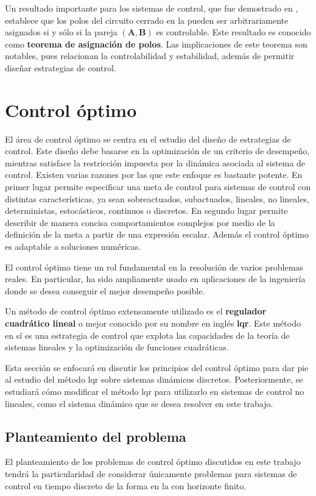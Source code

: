 Un resultado importante para los sistemas de control, que fue demostrado en \cite{Kwong2008, Gruene2021}, establece que los polos del circuito cerrado en la  pueden ser arbitrariamente asignados si y sólo si la pareja $(\mathbf{A}, \mathbf{B})$ es controlable. Este resultado es conocido como \textbf{teorema de asignación de polos}. Las implicaciones de este teorema son notables, pues relacionan la controlabilidad y estabilidad, además de permitir diseñar estrategias de control.

\section{Control óptimo}

El área de control óptimo se centra en el estudio del diseño de estrategias de control. Este diseño debe basarse en la optimización de un criterio de desempeño, mientras satisface la restricción impuesta por la dinámica asociada al sistema de control. Existen varias razones por las que este enfoque es bastante potente. En primer lugar permite especificar una meta de control para sistemas de control con distintas características, ya sean sobreactuados, subactuados, lineales, no lineales, deterministas, estocásticos, continuos o discretos. 
En segundo lugar permite describir de manera concisa comportamientos complejos por medio de la definición de la meta a partir de una expresión escalar. Además el control óptimo es adaptable a soluciones numéricas. \cite{underactuated} 

El control óptimo tiene un rol fundamental en la resolución de varios problemas reales. En particular, ha sido ampliamente usado en aplicaciones de la ingeniería donde se desea conseguir el mejor desempeño posible.

Un método de control óptimo extensamente utilizado es el \textbf{regulador cuadrático lineal} o mejor conocido por su nombre en inglés \textbf{\acrfull{lqr}}. Este método en sí es una estrategia de control que explota las capacidades de la teoría de sistemas lineales y la optimización de funciones cuadráticas. 

Esta sección se enfocará en discutir los principios del control óptimo para dar pie al estudio del método \acrshort{lqr} sobre sistemas dinámicos discretos. Posteriormente, se estudiará cómo modificar el método \acrshort{lqr} para utilizarlo en sistemas de control no lineales, como el sistema dinámico que se desea resolver en este trabajo.

\subsection{Planteamiento del problema}
El planteamiento de los problemas de control óptimo discutidos en este trabajo tendrá la particularidad de considerar únicamente problemas para sistemas de control en tiempo discreto de la forma en la  con horizonte finito.

